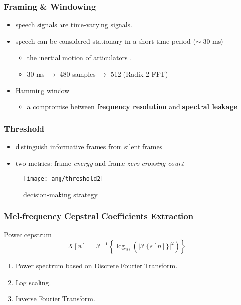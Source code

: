 \begin{frame}
\frametitle{Framing \& Windowing}
\begin{itemize}
	\item speech signals are time-varying signals.
	\item speech can be considered stationary in a short-time period ($\sim$ 30 ms)
	\begin{itemize}
		\item the inertial motion of articulators \cite{brandstein1995practical}.
		\item 30 ms $\longrightarrow$ 480 samples $\longrightarrow$ 512 (Radix-2 FFT)
	\end{itemize}
	\item Hamming window
	\begin{itemize}
		\item a compromise between \textbf{frequency resolution} and \textbf{spectral leakage}
	\end{itemize}
\end{itemize}
\end{frame}


\begin{frame}
\frametitle{Threshold}
\begin{itemize}
\item distinguish informative frames from silent frames
\item two metrics: frame \textit{energy} and frame \textit{zero-crossing count}
\end{itemize}

\begin{figure}[H]
\centering
\texttt{[image: ang/threshold2]}
\caption{decision-making strategy}
\end{figure}
\end{frame}


\begin{frame}
\frametitle{Mel-frequency Cepstral Coefficients Extraction}

Power cepstrum
\begin{equation}
X[n] = \mathcal{F}^{-1} \left\{\log_{10} \left( |\mathcal{F}\{s[n]\}|^2 \right) \right\}
\end{equation}
\vspace{10pt}

\begin{enumerate}
\item Power spectrum based on Discrete Fourier Transform.
\item Log scaling.
\item Inverse Fourier Transform.
\end{enumerate}
\end{frame}

